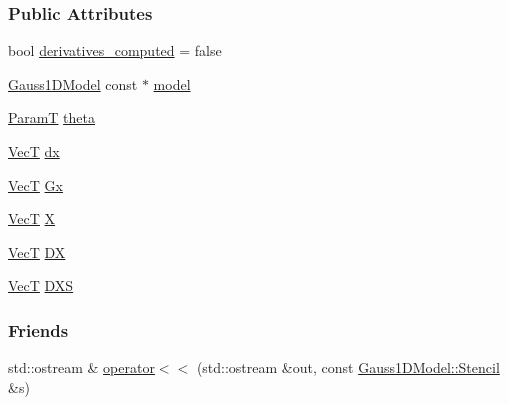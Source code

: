 \subsubsection*{Public Attributes}
\begin{DoxyCompactItemize}
\item 
bool \hyperlink{classmappel_1_1Gauss1DModel_1_1Stencil_a799e21dea3f00371748444f2ea80dba3}{derivatives\+\_\+computed} = false
\item 
\hyperlink{classmappel_1_1Gauss1DModel}{Gauss1\+D\+Model} const $\ast$ \hyperlink{classmappel_1_1Gauss1DModel_1_1Stencil_a22c7f0f7fd29ee1cc587f331ef186c76}{model}
\item 
\hyperlink{classmappel_1_1Gauss1DModel_1_1Stencil_a861a81c7bbd677e31bf3ab20467a2adc}{ParamT} \hyperlink{classmappel_1_1Gauss1DModel_1_1Stencil_a2428fa45a83396cad7861fbeea44a86a}{theta}
\item 
\hyperlink{namespacemappel_a2225ad69f358daa3f4f99282a35b9a3a}{VecT} \hyperlink{classmappel_1_1Gauss1DModel_1_1Stencil_afb0de9218a5def7bf8a68eb29bfba910}{dx}
\item 
\hyperlink{namespacemappel_a2225ad69f358daa3f4f99282a35b9a3a}{VecT} \hyperlink{classmappel_1_1Gauss1DModel_1_1Stencil_af526cf4c9b59b898727d741f692970e8}{Gx}
\item 
\hyperlink{namespacemappel_a2225ad69f358daa3f4f99282a35b9a3a}{VecT} \hyperlink{classmappel_1_1Gauss1DModel_1_1Stencil_a1cb021aeb56c7fadd2a6b401d95239ae}{X}
\item 
\hyperlink{namespacemappel_a2225ad69f358daa3f4f99282a35b9a3a}{VecT} \hyperlink{classmappel_1_1Gauss1DModel_1_1Stencil_a93a43ebc274ff8662990d8e71415f806}{DX}
\item 
\hyperlink{namespacemappel_a2225ad69f358daa3f4f99282a35b9a3a}{VecT} \hyperlink{classmappel_1_1Gauss1DModel_1_1Stencil_aa8eaf4d165d0b19f9e4c44a60b066e54}{D\+XS}
\end{DoxyCompactItemize}
\subsubsection*{Friends}
\begin{DoxyCompactItemize}
\item 
std\+::ostream \& \hyperlink{classmappel_1_1Gauss1DModel_1_1Stencil_ae62aeb751e63142d9dc20ebf7c5b8999}{operator$<$$<$} (std\+::ostream \&out, const \hyperlink{classmappel_1_1Gauss1DModel_1_1Stencil}{Gauss1\+D\+Model\+::\+Stencil} \&s)
\end{DoxyCompactItemize}


